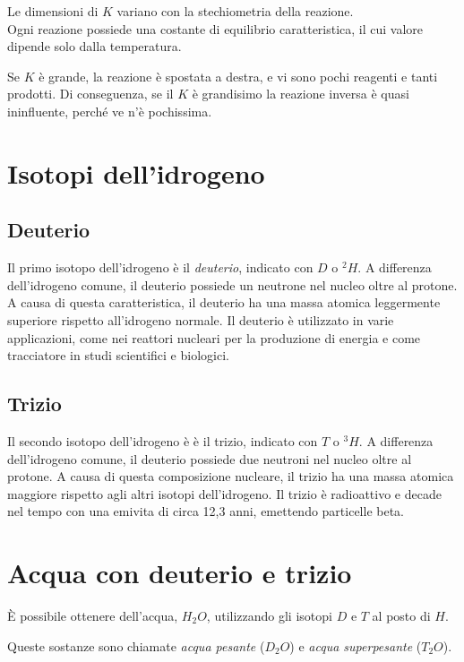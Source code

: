 \documentclass[a4paper]{article}
\begin{document}
Le dimensioni di \(K\) variano con la stechiometria della reazione.\\
Ogni reazione possiede una costante di equilibrio caratteristica,
il cui valore dipende solo dalla temperatura.

Se \(K\) è grande, la reazione è spostata a destra,
e vi sono pochi reagenti e tanti prodotti.
Di conseguenza, se il \(K\) è grandisimo la reazione inversa è quasi
ininfluente, perché ve n'è pochissima.

\pagebreak

\section{Isotopi dell'idrogeno}

\subsection{Deuterio}

Il primo isotopo dell'idrogeno è il \textit{deuterio}, indicato con \(D\) o \(^2H\).
A differenza dell'idrogeno comune, il deuterio possiede un neutrone nel nucleo oltre al protone.
A causa di questa caratteristica, il deuterio ha una massa atomica leggermente superiore rispetto all'idrogeno normale.
Il deuterio è utilizzato in varie applicazioni, come nei reattori nucleari per la produzione di energia e come tracciatore in studi scientifici e biologici. 

\subsection{Trizio}

Il secondo isotopo dell'idrogeno è è il trizio, indicato con \(T\) o \(^3H\).
A differenza dell'idrogeno comune, il deuterio possiede due neutroni nel nucleo oltre al protone.
A causa di questa composizione nucleare, il trizio ha una massa atomica maggiore rispetto agli altri isotopi dell'idrogeno.
Il trizio è radioattivo e decade nel tempo con una emivita di circa 12,3 anni, emettendo particelle beta.

\section{Acqua con deuterio e trizio}

È possibile ottenere dell'acqua, \(H_2O\), utilizzando gli isotopi \(D\) e \(T\) al posto di \(H\).

Queste sostanze sono chiamate \textit{acqua pesante} (\(D_2O\)) e
\textit{acqua superpesante} (\(T_2O\)).
\end{document}
